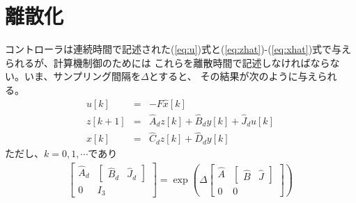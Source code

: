 \documentclass[a4j,11pt,twoside]{ujbook}
\begin{document}
	\section{離散化}
		コントローラは連続時間で記述された(\ref{eq:u})式と(\ref{eq:zhat})-(\ref{eq:xhat})式で与えられるが、計算機制御のためには
		これらを離散時間で記述しなければならない。いま、サンプリング間隔を$\Delta$とすると、
		その結果が次のように与えられる。
		\begin{eqnarray*}
			u[k]       & = & -F\hat{x}[k]\\
			z[k+1]     & = & \hat{A}_dz[k] + \hat{B}_dy[k] + \hat{J}_du[k]\\
			\hat{x}[k] & = & \hat{C}_dz[k] + \hat{D}_dy[k]
		\end{eqnarray*}
		ただし、$k = 0,1,\cdots$であり
		\begin{eqnarray*}
			\left[
				\begin{array}{cc}
					\hat{A}_d & \left[\begin{array}{cc} \hat{B}_d & \hat{J}_d \end{array}
					\right]\\
					0 & I_3
				\end{array}
			\right]
			=
			\exp{
				\left(
					\Delta
					\left[
					\begin{array}{cc}
						\hat{A} & \left[\begin{array}{cc} \hat{B} & \hat{J} \end{array}
						\right]\\
						0 & 0
					\end{array}
					\right]
				\right)
			}
		\end{eqnarray*}
		
\end{document}
